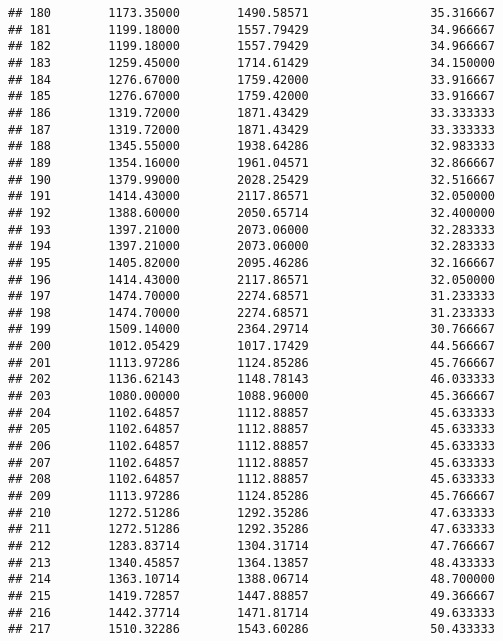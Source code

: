 \documentclass[]{article}
\begin{document}
\begin{verbatim}
## 180        1173.35000        1490.58571                 35.316667
## 181        1199.18000        1557.79429                 34.966667
## 182        1199.18000        1557.79429                 34.966667
## 183        1259.45000        1714.61429                 34.150000
## 184        1276.67000        1759.42000                 33.916667
## 185        1276.67000        1759.42000                 33.916667
## 186        1319.72000        1871.43429                 33.333333
## 187        1319.72000        1871.43429                 33.333333
## 188        1345.55000        1938.64286                 32.983333
## 189        1354.16000        1961.04571                 32.866667
## 190        1379.99000        2028.25429                 32.516667
## 191        1414.43000        2117.86571                 32.050000
## 192        1388.60000        2050.65714                 32.400000
## 193        1397.21000        2073.06000                 32.283333
## 194        1397.21000        2073.06000                 32.283333
## 195        1405.82000        2095.46286                 32.166667
## 196        1414.43000        2117.86571                 32.050000
## 197        1474.70000        2274.68571                 31.233333
## 198        1474.70000        2274.68571                 31.233333
## 199        1509.14000        2364.29714                 30.766667
## 200        1012.05429        1017.17429                 44.566667
## 201        1113.97286        1124.85286                 45.766667
## 202        1136.62143        1148.78143                 46.033333
## 203        1080.00000        1088.96000                 45.366667
## 204        1102.64857        1112.88857                 45.633333
## 205        1102.64857        1112.88857                 45.633333
## 206        1102.64857        1112.88857                 45.633333
## 207        1102.64857        1112.88857                 45.633333
## 208        1102.64857        1112.88857                 45.633333
## 209        1113.97286        1124.85286                 45.766667
## 210        1272.51286        1292.35286                 47.633333
## 211        1272.51286        1292.35286                 47.633333
## 212        1283.83714        1304.31714                 47.766667
## 213        1340.45857        1364.13857                 48.433333
## 214        1363.10714        1388.06714                 48.700000
## 215        1419.72857        1447.88857                 49.366667
## 216        1442.37714        1471.81714                 49.633333
## 217        1510.32286        1543.60286                 50.433333

\end{verbatim}
\end{document}
